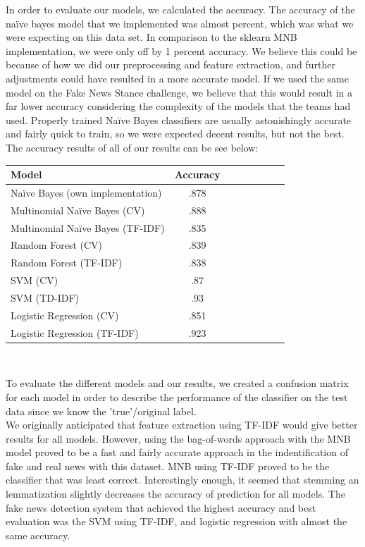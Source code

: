 \documentclass{neu_handout}
\begin{document}
In order to evaluate our models, we calculated the accuracy. The accuracy of the na\"ive bayes model that we implemented was almost percent, which was what we were expecting on this data set. In comparison to the sklearn MNB implementation, we were only off by 1 percent accuracy. We believe this could be because of how we did our preprocessing and feature extraction, and further adjustments could have resulted in a more accurate model. If we used the same model on the Fake News Stance challenge, we believe that this would result in a far lower accuracy considering the complexity of the models that the teams had used. Properly trained Na\"ive Bayes classifiers are usually astonishingly accurate and fairly quick to train, so we were expected decent results, but not the best. The accuracy results of all of our results can be see below:

\begin{table}[h]
\centering
\begin{tabular}{l*{6}{c}r}
Model     & Accuracy  \\
\hline
Naïve Bayes  (own implementation) & .878   \\
Multinomial Naïve Bayes (CV)       & .888  \\
Multinomial Naïve Bayes (TF-IDF)      & .835  \\
Random Forest (CV)     & .839  \\
Random Forest (TF-IDF)     & .838  \\
SVM (CV)     & .87  \\
SVM (TD-IDF)     & .93  \\
Logistic Regression (CV)  & .851 \\
Logistic Regression (TF-IDF)  & .923 \\
\end{tabular}\\
\end{table}



To evaluate the different models and our results, we created a confusion matrix for each model in order to describe the performance of the classifier on the test data since we know the 'true'/original label.\\

We originally anticipated that feature extraction using TF-IDF would give better results for all models. However, using the bag-of-words approach with the MNB model proved to be a fast and fairly accurate approach in the indentification of fake and real news with this dataset. MNB using TF-IDF proved to be the classifier that was least correct. Interestingly enough, it seemed that stemming an lemmatization slightly decreases the accuracy of prediction for all models. The fake news detection system that achieved the highest accuracy and best evaluation was the SVM using TF-IDF, and logistic regression with almost the same accuracy.
\end{document}
